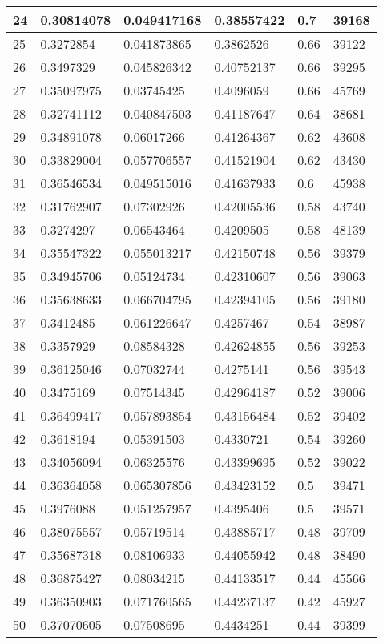 \begin{longtable}{|l|l|l|l|l|l|}
24 & 0.30814078 & 0.049417168 & 0.38557422 & 0.7 & 39168 \\ \hline 
25 & 0.3272854 & 0.041873865 & 0.3862526 & 0.66 & 39122 \\ \hline 
26 & 0.3497329 & 0.045826342 & 0.40752137 & 0.66 & 39295 \\ \hline 
27 & 0.35097975 & 0.03745425 & 0.4096059 & 0.66 & 45769 \\ \hline 
28 & 0.32741112 & 0.040847503 & 0.41187647 & 0.64 & 38681 \\ \hline 
29 & 0.34891078 & 0.06017266 & 0.41264367 & 0.62 & 43608 \\ \hline 
30 & 0.33829004 & 0.057706557 & 0.41521904 & 0.62 & 43430 \\ \hline 
31 & 0.36546534 & 0.049515016 & 0.41637933 & 0.6 & 45938 \\ \hline 
32 & 0.31762907 & 0.07302926 & 0.42005536 & 0.58 & 43740 \\ \hline 
33 & 0.3274297 & 0.06543464 & 0.4209505 & 0.58 & 48139 \\ \hline 
34 & 0.35547322 & 0.055013217 & 0.42150748 & 0.56 & 39379 \\ \hline 
35 & 0.34945706 & 0.05124734 & 0.42310607 & 0.56 & 39063 \\ \hline 
36 & 0.35638633 & 0.066704795 & 0.42394105 & 0.56 & 39180 \\ \hline 
37 & 0.3412485 & 0.061226647 & 0.4257467 & 0.54 & 38987 \\ \hline 
38 & 0.3357929 & 0.08584328 & 0.42624855 & 0.56 & 39253 \\ \hline 
39 & 0.36125046 & 0.07032744 & 0.4275141 & 0.56 & 39543 \\ \hline 
40 & 0.3475169 & 0.07514345 & 0.42964187 & 0.52 & 39006 \\ \hline 
41 & 0.36499417 & 0.057893854 & 0.43156484 & 0.52 & 39402 \\ \hline 
42 & 0.3618194 & 0.05391503 & 0.4330721 & 0.54 & 39260 \\ \hline 
43 & 0.34056094 & 0.06325576 & 0.43399695 & 0.52 & 39022 \\ \hline 
44 & 0.36364058 & 0.065307856 & 0.43423152 & 0.5 & 39471 \\ \hline 
45 & 0.3976088 & 0.051257957 & 0.4395406 & 0.5 & 39571 \\ \hline 
46 & 0.38075557 & 0.05719514 & 0.43885717 & 0.48 & 39709 \\ \hline 
47 & 0.35687318 & 0.08106933 & 0.44055942 & 0.48 & 38490 \\ \hline 
48 & 0.36875427 & 0.08034215 & 0.44133517 & 0.44 & 45566 \\ \hline 
49 & 0.36350903 & 0.071760565 & 0.44237137 & 0.42 & 45927 \\ \hline 
50 & 0.37070605 & 0.07508695 & 0.4434251 & 0.44 & 39399 \\ \hline 
\end{longtable}